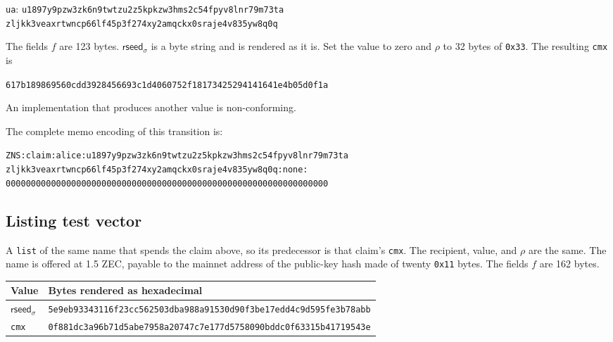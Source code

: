 \noindent\texttt{ua}: \texttt{u1897y9pzw3zk6n9twtzu2z5kpkzw3hms2c54fpyv8lnr79m73ta}\\
\texttt{zljkk3veaxrtwncp66lf45p3f274xy2amqckx0sraje4v835yw8q0q}

The fields $f$ are 123 bytes. $\mathsf{rseed}_\sigma$ is a byte string and is rendered as it is. Set the value to zero and $\rho$ to 32 bytes of \texttt{0x33}. The resulting \texttt{cmx} is

{\footnotesize
\begin{center}
\texttt{617b189869560cdd3928456693c1d4060752f18173425294141641e4b05d0f1a}
\end{center}
}

\noindent An implementation that produces another value is non-conforming.

The complete memo encoding of this transition is:

{\footnotesize
\begin{flushleft}
\texttt{ZNS:claim:alice:u1897y9pzw3zk6n9twtzu2z5kpkzw3hms2c54fpyv8lnr79m73ta}\\
\texttt{zljkk3veaxrtwncp66lf45p3f274xy2amqckx0sraje4v835yw8q0q:none:}\\
\texttt{0000000000000000000000000000000000000000000000000000000000000000}
\end{flushleft}
}

\subsection{Listing test vector}

A \texttt{list} of the same name that spends the claim above, so its predecessor is that claim's \texttt{cmx}. The recipient, value, and $\rho$ are the same. The name is offered at 1.5 ZEC, payable to the mainnet address of the public-key hash made of twenty \texttt{0x11} bytes. The fields $f$ are 162 bytes.

{\footnotesize
\begin{center}
\begin{tabularx}{\textwidth}{@{}lY@{}}
\toprule
Value & Bytes rendered as hexadecimal \\
\midrule
$\mathsf{rseed}_\sigma$ & \texttt{5e9eb93343116f23cc562503dba988a91530d90f3be17edd4c9d595fe3b78abb} \\
\texttt{cmx} & \texttt{0f881dc3a96b71d5abe7958a20747c7e177d5758090bddc0f63315b41719543e} \\
\bottomrule
\end{tabularx}
\end{center}
}

